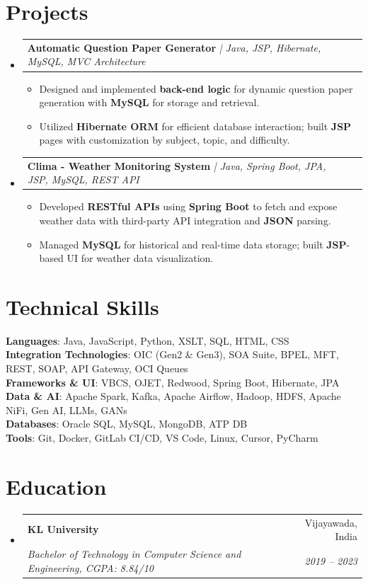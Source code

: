 \documentclass[letterpaper,11pt]{article}
\makeatletter
\newcommand{\resumeItem}[1]{
  \item\small{
    {#1 \vspace{-2pt}}
  }
}
\newcommand{\resumeSubheading}[4]{
  \vspace{-2pt}\item
    \begin{tabular*}{0.97\textwidth}[t]{l@{\extracolsep{\fill}}r}
      \textbf{#1} & #2 \\
      \textit{\small#3} & \textit{\small #4} \\
    \end{tabular*}\vspace{-7pt}
}
\newcommand{\resumeProjectHeading}[2]{
    \item
    \begin{tabular*}{0.97\textwidth}{l@{\extracolsep{\fill}}r}
      \small#1 & #2 \\
    \end{tabular*}\vspace{-7pt}
}
\newcommand{\resumeSubHeadingListStart}{\begin{itemize}[leftmargin=0.15in, label={}]}
\newcommand{\resumeSubHeadingListEnd}{\end{itemize}}
\newcommand{\resumeItemListStart}{\begin{itemize}}
\newcommand{\resumeItemListEnd}{\end{itemize}\vspace{-5pt}}
\makeatother
\begin{document}
\section{Projects}
\resumeSubHeadingListStart
    \resumeProjectHeading
        {\textbf{Automatic Question Paper Generator} \textit{| Java, JSP, Hibernate, MySQL, MVC Architecture}}{}
    \resumeItemListStart
        \resumeItem{Designed and implemented \textbf{back-end logic} for dynamic question paper generation with \textbf{MySQL} for storage and retrieval.}
        \resumeItem{Utilized \textbf{Hibernate ORM} for efficient database interaction; built \textbf{JSP} pages with customization by subject, topic, and difficulty.}
    \resumeItemListEnd
    \resumeProjectHeading
        {\textbf{Clima - Weather Monitoring System} \textit{| Java, Spring Boot, JPA, JSP, MySQL, REST API}}{}
    \resumeItemListStart
        \resumeItem{Developed \textbf{RESTful APIs} using \textbf{Spring Boot} to fetch and expose weather data with third-party API integration and \textbf{JSON} parsing.}
        \resumeItem{Managed \textbf{MySQL} for historical and real-time data storage; built \textbf{JSP}-based UI for weather data visualization.}
    \resumeItemListEnd
\resumeSubHeadingListEnd

\section{Technical Skills}
\begin{itemize}[leftmargin=0.15in, label={}]
    \small{\item{
        \textbf{Languages}{: Java, JavaScript, Python, XSLT, SQL, HTML, CSS} \\
        \textbf{Integration Technologies}{: OIC (Gen2 \& Gen3), SOA Suite, BPEL, MFT, REST, SOAP, API Gateway, OCI Queues} \\
        \textbf{Frameworks \& UI}{: VBCS, OJET, Redwood, Spring Boot, Hibernate, JPA} \\
        \textbf{Data \& AI}{: Apache Spark, Kafka, Apache Airflow, Hadoop, HDFS, Apache NiFi, Gen AI, LLMs, GANs} \\
        \textbf{Databases}{: Oracle SQL, MySQL, MongoDB, ATP DB} \\
        \textbf{Tools}{: Git, Docker, GitLab CI/CD, VS Code, Linux, Cursor, PyCharm}
    }}
\end{itemize}

\section{Education}
\resumeSubHeadingListStart
    \resumeSubheading
        {KL University}{Vijayawada, India}
        {Bachelor of Technology in Computer Science and Engineering, CGPA: 8.84/10}{2019 -- 2023}
\resumeSubHeadingListEnd
\end{document}
